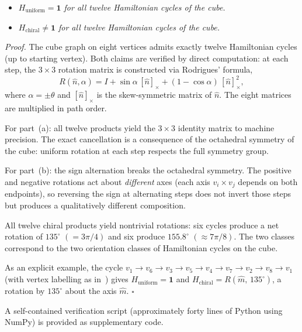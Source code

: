 \documentclass[twocolumn]{iopjournal}
\begin{document}
\begin{itemize}
\item[(a)] \textit{$H_{\mathrm{uniform}} = \mathbf{1}$
for all twelve Hamiltonian cycles of the cube.}
\item[(b)] \textit{$H_{\mathrm{chiral}} \neq \mathbf{1}$
for all twelve Hamiltonian cycles of the cube.}
\end{itemize}

\medskip\noindent\textit{Proof.}
The cube graph on eight vertices admits exactly twelve
Hamiltonian cycles (up to starting vertex).  Both claims
are verified by direct computation: at each step, the
$3 \times 3$ rotation matrix is constructed via
Rodrigues' formula,
\begin{equation}
  R(\hat{n}, \alpha) = I + \sin\alpha\,[\hat{n}]_{\times}
  + (1 - \cos\alpha)\,[\hat{n}]_{\times}^2,
  \label{eq:rodrigues}
\end{equation}
where $\alpha = \pm\theta$ and $[\hat{n}]_{\times}$ is
the skew-symmetric matrix of $\hat{n}$.  The eight
matrices are multiplied in path order.

For part~(a): all twelve products yield the
$3 \times 3$ identity matrix to machine precision.  The
exact cancellation is a consequence of the octahedral
symmetry of the cube: uniform rotation at each step
respects the full symmetry group.

For part~(b): the sign alternation breaks the octahedral
symmetry.  The positive and negative rotations act about
\emph{different} axes (each axis $v_i \times v_j$
depends on both endpoints), so reversing the sign at
alternating steps does not invert those steps but
produces a qualitatively different composition.

All twelve chiral products yield nontrivial rotations:
six cycles produce a net rotation of $135^{\circ}$
$(= 3\pi/4)$ and six produce $155.8^{\circ}$
$(\approx 7\pi/8)$.  The two classes correspond to the
two orientation classes of Hamiltonian cycles on the
cube.

As an explicit example, the cycle
$v_1 \!\to\! v_6 \!\to\! v_3 \!\to\! v_5 \!\to\! v_4
\!\to\! v_7 \!\to\! v_2 \!\to\! v_8 \!\to\! v_1$
(with vertex labelling as in~\cite{Nelson2026a}) gives
$H_{\mathrm{uniform}} = \mathbf{1}$ and
$H_{\mathrm{chiral}} = R(\hat{m},\, 135^{\circ})$, a
rotation by $135^{\circ}$ about the axis $\hat{m}$.
\hfill$\square$

\medskip
A self-contained verification script (approximately
forty lines of Python using NumPy) is provided as
supplementary code.
\end{document}
